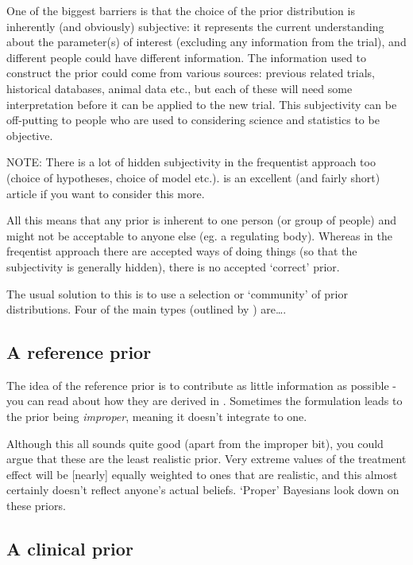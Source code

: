 \documentclass[
  openany]{book}
\theoremstyle{definition}
\theoremstyle{definition}
\theoremstyle{definition}
\theoremstyle{definition}
\theoremstyle{remark}
\begin{document}
One of the biggest barriers is that the choice of the prior distribution is inherently (and obviously) subjective: it represents the current understanding about the parameter(s) of interest (excluding any information from the trial), and different people could have different information. The information used to construct the prior could come from various sources: previous related trials, historical databases, animal data etc., but each of these will need some interpretation before it can be applied to the new trial. This subjectivity can be off-putting to people who are used to considering science and statistics to be objective.

NOTE: There is a lot of hidden subjectivity in the frequentist approach too (choice of hypotheses, choice of model etc.). \citet{berger1988statistical} is an excellent (and fairly short) article if you want to consider this more.

All this means that any prior is inherent to one person (or group of people) and might not be acceptable to anyone else (eg. a regulating body). Whereas in the freqentist approach there are accepted ways of doing things (so that the subjectivity is generally hidden), there is no accepted `correct' prior.

The usual solution to this is to use a selection or `community' of prior distributions. Four of the main types (outlined by \citet{spiegelhalter1994bayesian}) are\ldots.

\hypertarget{a-reference-prior}{%
\subsection*{A reference prior}\label{a-reference-prior}}

The idea of the reference prior is to contribute as little information as possible - you can read about how they are derived in \citet{berger2009formal}. Sometimes the formulation leads to the prior being \emph{improper}, meaning it doesn't integrate to one.

Although this all sounds quite good (apart from the improper bit), you could argue that these are the least realistic prior. Very extreme values of the treatment effect will be {[}nearly{]} equally weighted to ones that are realistic, and this almost certainly doesn't reflect anyone's actual beliefs. `Proper' Bayesians look down on these priors.

\hypertarget{a-clinical-prior}{%
\subsection*{A clinical prior}\label{a-clinical-prior}}
\end{document}
